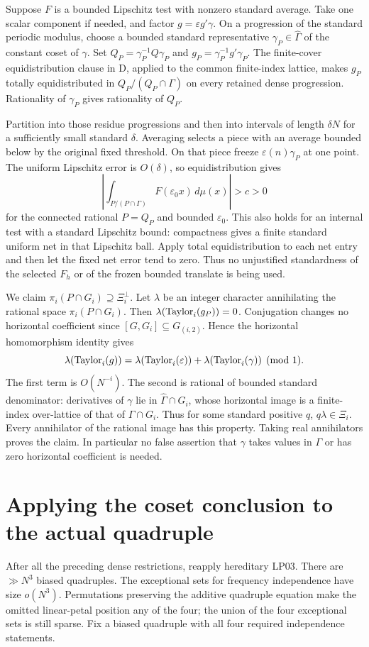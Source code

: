 \documentclass[11pt]{article}
\begin{document}
Suppose $F$ is a bounded Lipschitz test with nonzero standard average.
Take one scalar component if needed, and factor $g=\varepsilon g'\gamma$.
On a progression of the standard periodic modulus, choose a bounded standard
representative $\gamma_P\in\widehat\Gamma$ of the constant coset of $\gamma$.
Set $Q_P=\gamma_P^{-1}Q\gamma_P$ and
$g_P=\gamma_P^{-1}g'\gamma_P$. The finite-cover equidistribution clause in
D, applied to the common finite-index lattice, makes $g_P$ totally
equidistributed in $Q_P/(Q_P\cap\Gamma)$ on every retained dense progression.
Rationality of $\gamma_P$ gives rationality of $Q_P$.

Partition into those residue progressions and then into intervals of length
$\delta N$ for a sufficiently small standard $\delta$. Averaging selects a
piece with an average bounded below by the original fixed threshold.
On that piece freeze $\varepsilon(n)\gamma_P$ at one point. The uniform
Lipschitz error is $O(\delta)$, so equidistribution gives
\begin{equation}\label{eq:coset}
 \left|\int_{P/(P\cap\Gamma)}F(\varepsilon_0x)\,d\mu(x)\right|>c>0
\end{equation}
for the connected rational $P=Q_P$ and bounded $\varepsilon_0$.
This also holds for an internal test with a standard Lipschitz bound:
compactness gives a finite standard uniform net in that Lipschitz ball.
Apply total equidistribution to each net entry and then let the fixed net
error tend to zero. Thus no unjustified standardness of the selected $F_h$
or of the frozen bounded translate is being used.

We claim $\pi_i(P\cap G_i)\supseteq\Xi_i^\perp$. Let $\lambda$ be an
integer character annihilating the rational space $\pi_i(P\cap G_i)$.
Then $\lambda(\operatorname{Taylor}_i(g_P))=0$. Conjugation changes no horizontal
coefficient since $[G,G_i]\subseteq G_{(i,2)}$. Hence the horizontal
homomorphism identity gives
\[
 \lambda(\operatorname{Taylor}_i(g))=
 \lambda(\operatorname{Taylor}_i(\varepsilon))+
 \lambda(\operatorname{Taylor}_i(\gamma)) \pmod1.
\]
The first term is $O(N^{-i})$. The second is rational of bounded standard
denominator: derivatives of $\gamma$ lie in $\widehat\Gamma\cap G_i$, whose
horizontal image is a finite-index over-lattice of that of $\Gamma\cap G_i$.
Thus for some standard positive $q$, $q\lambda\in\Xi_i$. Every annihilator
of the rational image has this property. Taking real annihilators proves the
claim. In particular no false assertion that $\gamma$ takes values in
$\Gamma$ or has zero horizontal coefficient is needed.

\section{Applying the coset conclusion to the actual quadruple}
After all the preceding dense restrictions, reapply hereditary LP03.
There are $\gg N^3$ biased quadruples. The exceptional sets for frequency
independence have size $o(N^3)$. Permutations preserving the additive
quadruple equation make the omitted linear-petal position any of the four;
the union of the four exceptional sets is still sparse. Fix a biased
quadruple with all four required independence statements.
\end{document}
